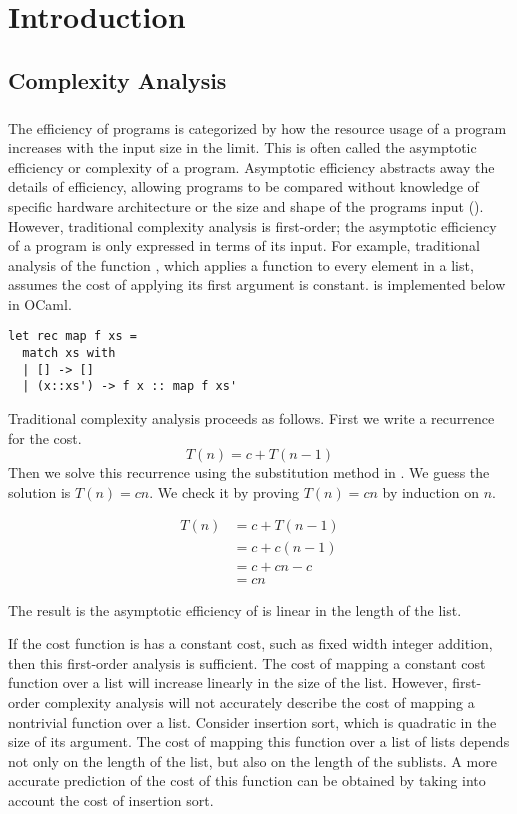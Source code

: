 \chapter{Introduction}

\section{Complexity Analysis}
\paragraph{}
The efficiency of programs is categorized by how the resource usage of a
program increases with the input size in the limit.  This is often called the
asymptotic efficiency or complexity of a program.  Asymptotic efficiency
abstracts away the details of efficiency, allowing programs to be compared
without knowledge of specific hardware architecture or the size and shape of
the programs input (\citet{Cormen2001}).  However, traditional complexity
analysis is first-order; the asymptotic efficiency of a program is only
expressed in terms of its input.  For example, traditional analysis of the function
, which applies a function to every element in a
list, assumes the cost of applying its first argument is constant.  
is implemented below in OCaml.

\lstset{language=[Objective]Caml}
\begin{lstlisting}
let rec map f xs =
  match xs with
  | [] -> []
  | (x::xs') -> f x :: map f xs'
\end{lstlisting}

Traditional complexity analysis proceeds as follows.  First we write a
recurrence for the cost.  \[ T(n) = c + T(n-1) \] Then we solve this recurrence
using the substitution method in \citet{Cormen2001}.  We guess the solution is
$T(n) = cn$.  We check it by proving $T(n) = cn$ by induction on $n$.

\begin{align*}
  T(n) &= c + T(n-1)\\
       &= c + c(n-1) \\
       &= c + cn - c \\
       &= cn
\end{align*}

The result is the asymptotic efficiency of  is linear in
the length of the list.

If the cost function is has a constant cost, such as fixed width integer
addition, then this first-order analysis is sufficient.  The cost of mapping a
constant cost function over a list will increase linearly in the size of the
list.  However, first-order complexity analysis will not accurately describe
the cost of mapping a nontrivial function over a list.  Consider insertion
sort, which is quadratic in the size of its argument.  The cost of mapping this
function over a list of lists depends not only on the length of the list, but
also on the length of the sublists.  A more accurate prediction of the cost of
this function can be obtained by taking into account the cost of insertion
sort.


